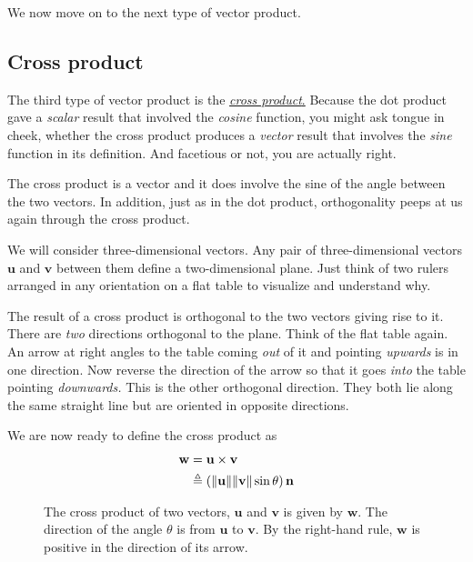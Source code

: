 \documentclass[
  a4paper,
]{article}
\begin{document}
We now move on to the next type of vector product.

\hypertarget{cross-product}{%
\subsection{Cross product}\label{cross-product}}

The third type of vector product is the
\href{https://mathworld.wolfram.com/CrossProduct.html}{\emph{cross
product}.} Because the dot product gave a \emph{scalar} result that
involved the \emph{cosine} function, you might ask tongue in cheek,
whether the cross product produces a \emph{vector} result that involves
the \emph{sine} function in its definition. And facetious or not, you
are actually right.  \normalfont

The cross product is a vector and it does involve the sine of the angle
between the two vectors. In addition, just as in the dot product,
orthogonality peeps at us again through the cross product.

We will consider three-dimensional vectors. Any pair of
three-dimensional vectors \(\mathbf{u}\) and \(\mathbf{v}\) between them
define a two-dimensional plane. Just think of two rulers arranged in any
orientation on a flat table to visualize and understand why.

The result of a cross product is orthogonal to the two vectors giving
rise to it. There are \emph{two} directions orthogonal to the plane.
Think of the flat table again. An arrow at right angles to the table
coming \emph{out} of it and pointing \emph{upwards} is in one direction.
Now reverse the direction of the arrow so that it goes \emph{into} the
table pointing \emph{downwards.} This is the other orthogonal direction.
They both lie along the same straight line but are oriented in opposite
directions.

We are now ready to define the cross product as \[
\begin{aligned}
\mathbf{w} &= \mathbf{u} \times \mathbf{v}\\
&\triangleq (\lVert\mathbf{u}\rVert \lVert\mathbf{v}\rVert \sin \theta) \thinspace \mathbf{n}
\end{aligned}
\]

\begin{figure}
\hypertarget{fig:cross-product}{%
\centering

\caption{The cross product of two vectors, \(\mathbf{u}\) and
\(\mathbf{v}\) is given by \(\mathbf{w}\). The direction of the angle
\(\theta\) is from \(\mathbf{u}\) to \(\mathbf{v}\). By the right-hand
rule, \(\mathbf{w}\) is positive in the direction of its
arrow.}\label{fig:cross-product}
}
\end{figure}
\end{document}
